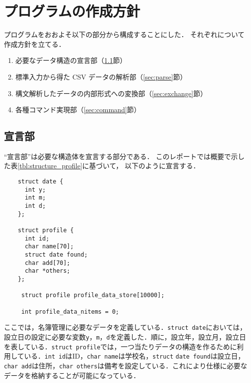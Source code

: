 \documentclass[a4j,11pt]{jarticle}
\begin{document}
\section{プログラムの作成方針}\label{sec:housin}

プログラムをおおよそ以下の部分から構成することにした．
それぞれについて作成方針を立てる．

\begin{enumerate}
\setlength{\parskip}{2pt} \setlength{\itemsep}{2pt}
    \item 必要なデータ構造の宣言部（\ref{sec:declare}節）
    \item 標準入力から得た CSV データの解析部（\ref{sec:parse}節）
    \item 構文解析したデータの内部形式への変換部（\ref{sec:exchange}節）
    \item 各種コマンド実現部（\ref{sec:command}節）
\end{enumerate}


\subsection{宣言部} 
\label{sec:declare}

``宣言部''は必要な構造体を宣言する部分である．
このレポートでは概要で示した表\ref{tbl:structure_profile}に基づいて，
以下のように宣言する．

{\fontsize{10pt}{11pt} \selectfont
\begin{verbatim}
    struct date {
      int y;
      int m;
      int d;
    };

    struct profile {
      int id;
      char name[70];
      struct date found;
      char add[70];
      char *others;
    };

     struct profile profile_data_store[10000];

     int profile_data_nitems = 0;

\end{verbatim}
}

ここでは，名簿管理に必要なデータを定義している．\verb|struct date|においては，設立日の設定に必要な変数\verb|y|，\verb|m|，\verb|d|を定義した．順に，設立年，設立月，設立日を表している．\verb|struct profile|では，一つ当たりデータの構造を作るために利用している．\verb|int id|はID，\verb|char name|は学校名，\verb|struct| \verb|date found|は設立日，\verb|char add|は住所，\verb|char others|は備考を設定している．これにより仕様に必要なデータを格納することが可能になっている．
\end{document}
